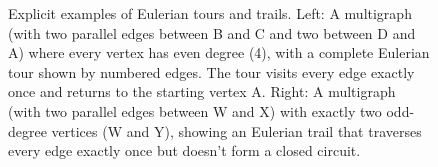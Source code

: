 \documentclass{article}
\theoremstyle{definition}
\begin{document}
\begin{figure}[ht]
\caption{Explicit examples of Eulerian tours and trails. Left: A multigraph (with two parallel edges between B and C and two between D and A) where every vertex has even degree (4), with a complete Eulerian tour shown by numbered edges. The tour visits every edge exactly once and returns to the starting vertex A. Right: A multigraph (with two parallel edges between W and X) with exactly two odd-degree vertices (W and Y), showing an Eulerian trail that traverses every edge exactly once but doesn't form a closed circuit.}
\label{fig:eulerian-tours-trails}
\end{figure}
\end{document}
